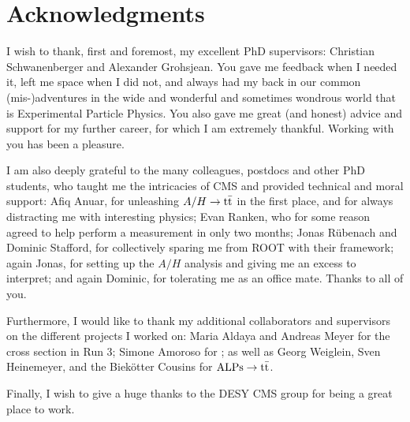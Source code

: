 \chapter{Acknowledgments}

I wish to thank, first and foremost, my excellent PhD supervisors: Christian Schwanenberger and Alexander Grohsjean. You gave me feedback when I needed it, left me space when I did not, and always had my back in our common (mis-)adventures in the wide and wonderful and sometimes wondrous world that is Experimental Particle Physics. You also gave me great (and honest) advice and support for my further career, for which I am extremely thankful. Working with you has been a pleasure.

I am also deeply grateful to the many colleagues, postdocs and other PhD students, who taught me the intricacies of CMS and provided technical and moral support: Afiq Anuar, for unleashing $A/H \rightarrow \mathrm{t \bar{t}}$ in the first place, and for always distracting me with interesting physics; Evan Ranken, who for some reason agreed to help perform a measurement in only two months; Jonas R{\"u}benach and Dominic Stafford, for collectively sparing me from ROOT with their framework; again Jonas, for setting up the $A/H$ analysis and giving me an excess to interpret; and again Dominic, for tolerating me as an office mate. Thanks to all of you.

Furthermore, I would like to thank my additional collaborators and supervisors on the different projects I worked on: Maria Aldaya and Andreas Meyer for the \ttbar cross section in Run 3; Simone Amoroso for \bbfourl; as well as Georg Weiglein, Sven Heinemeyer, and the Biek{\"o}tter Cousins for $\mathrm{ALPs} \rightarrow \mathrm{t \bar{t}}$. 

Finally, I wish to give a huge thanks to the DESY CMS group for being a great place to work.